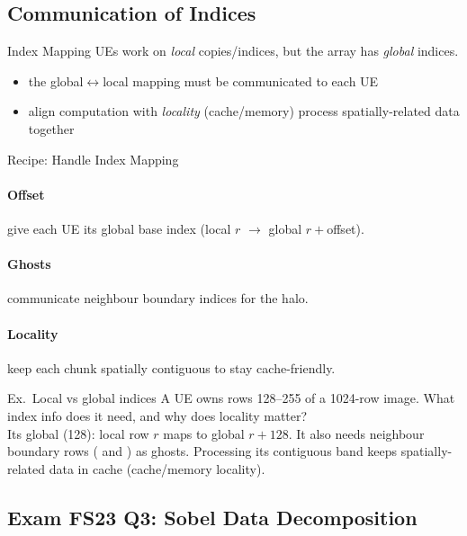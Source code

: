 \multend

\subsection{Communication of Indices}

\begin{definition}{Index Mapping}
    UEs work on \emph{local} copies/indices, but the array has \emph{global} indices.
    \begin{itemize}
        \item the global$\leftrightarrow$local mapping must be communicated to each UE
        \item align computation with \emph{locality} (cache/memory) process spatially-related data together
    \end{itemize}
\end{definition}

\begin{KR}{Recipe: Handle Index Mapping}
    \paragraph{Offset} give each UE its global base index (local $r$ $\to$ global $r+$offset).
    \paragraph{Ghosts} communicate neighbour boundary indices for the halo.
    \paragraph{Locality} keep each chunk spatially contiguous to stay cache-friendly.
\end{KR}

\begin{example2}{Ex.\ Local vs global indices}
    A UE owns rows 128--255 of a 1024-row image. What index info does it need, and why does locality matter?
     \\ 
    Its global  (128): local row $r$ maps to global $r+128$. It also needs neighbour boundary rows ( and ) as ghosts. Processing its contiguous band keeps spatially-related data in cache (cache/memory locality).
\end{example2}

\subsection{Exam FS23 Q3: Sobel Data Decomposition}


